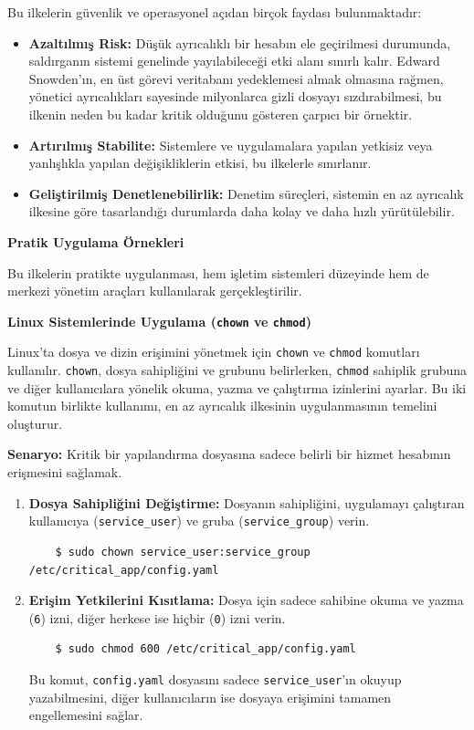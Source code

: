 Bu ilkelerin güvenlik ve operasyonel açıdan birçok faydası bulunmaktadır:
\begin{itemize}
    \item \textbf{Azaltılmış Risk:} Düşük ayrıcalıklı bir hesabın ele geçirilmesi durumunda, saldırganın sistemi genelinde yayılabileceği etki alanı sınırlı kalır. Edward Snowden'ın, en üst görevi veritabanı yedeklemesi almak olmasına rağmen, yönetici ayrıcalıkları sayesinde milyonlarca gizli dosyayı sızdırabilmesi, bu ilkenin neden bu kadar kritik olduğunu gösteren çarpıcı bir örnektir.
    \item \textbf{Artırılmış Stabilite:} Sistemlere ve uygulamalara yapılan yetkisiz veya yanlışlıkla yapılan değişikliklerin etkisi, bu ilkelerle sınırlanır.
    \item \textbf{Geliştirilmiş Denetlenebilirlik:} Denetim süreçleri, sistemin en az ayrıcalık ilkesine göre tasarlandığı durumlarda daha kolay ve daha hızlı yürütülebilir.
\end{itemize}

\textbf{Pratik Uygulama Örnekleri}

Bu ilkelerin pratikte uygulanması, hem işletim sistemleri düzeyinde hem de merkezi yönetim araçları kullanılarak gerçekleştirilir.

\textbf{Linux Sistemlerinde Uygulama (\texttt{chown} ve \texttt{chmod})}

Linux’ta dosya ve dizin erişimini yönetmek için \texttt{chown} ve \texttt{chmod} komutları kullanılır. \texttt{chown}, dosya sahipliğini ve grubunu belirlerken, \texttt{chmod} sahiplik grubuna ve diğer kullanıcılara yönelik okuma, yazma ve çalıştırma izinlerini ayarlar. Bu iki komutun birlikte kullanımı, en az ayrıcalık ilkesinin uygulanmasının temelini oluşturur.

\textbf{Senaryo:} Kritik bir yapılandırma dosyasına sadece belirli bir hizmet hesabının erişmesini sağlamak.

\begin{enumerate}
    \item \textbf{Dosya Sahipliğini Değiştirme:} Dosyanın sahipliğini, uygulamayı çalıştıran kullanıcıya (\texttt{service\_user}) ve gruba (\texttt{service\_group}) verin.
    \begin{verbatim}
    $ sudo chown service_user:service_group /etc/critical_app/config.yaml
    \end{verbatim}
    \item \textbf{Erişim Yetkilerini Kısıtlama:} Dosya için sadece sahibine okuma ve yazma (\texttt{6}) izni, diğer herkese ise hiçbir (\texttt{0}) izni verin.
    \begin{verbatim}
    $ sudo chmod 600 /etc/critical_app/config.yaml
    \end{verbatim}
    Bu komut, \texttt{config.yaml} dosyasını sadece \texttt{service\_user}'ın okuyup yazabilmesini, diğer kullanıcıların ise dosyaya erişimini tamamen engellemesini sağlar.
\end{enumerate}

